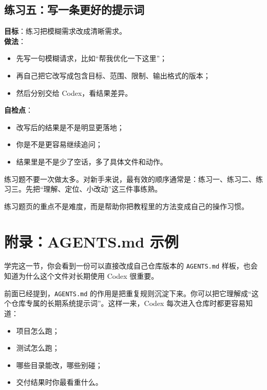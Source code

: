 \documentclass[UTF8,a4paper,12pt]{ctexart}
\begin{document}
\subsection{练习五：写一条更好的提示词}

\textbf{目标}：练习把模糊需求改成清晰需求。\\
\textbf{做法}：
\begin{itemize}
  \item 先写一句模糊请求，比如“帮我优化一下这里”；
  \item 再自己把它改写成包含目标、范围、限制、输出格式的版本；
  \item 然后分别交给 Codex，看结果差异。
\end{itemize}

\textbf{自检点}：
\begin{itemize}
  \item 改写后的结果是不是明显更落地；
  \item 你是不是更容易继续追问；
  \item 结果里是不是少了空话，多了具体文件和动作。
\end{itemize}

\begin{tipbox}
练习题不要一次做太多。对新手来说，最有效的顺序通常是：练习一、练习二、练习三。先把“理解、定位、小改动”这三件事练熟。
\end{tipbox}

\begin{sumbox}
练习题页的重点不是难度，而是帮助你把教程里的方法变成自己的操作习惯。
\end{sumbox}

\section{附录：AGENTS.md 示例}

\begin{learnbox}
学完这一节，你会看到一份可以直接改成自己仓库版本的 \texttt{AGENTS.md} 样板，也会知道为什么这个文件对长期使用 Codex 很重要。
\end{learnbox}

前面已经提到，\texttt{AGENTS.md} 的作用是把重复规则沉淀下来。你可以把它理解成“这个仓库专属的长期系统提示词”。这样一来，Codex 每次进入仓库时都更容易知道：
\begin{itemize}
  \item 项目怎么跑；
  \item 测试怎么跑；
  \item 哪些目录能改，哪些别碰；
  \item 交付结果时你最看重什么。
\end{itemize}
\end{document}

